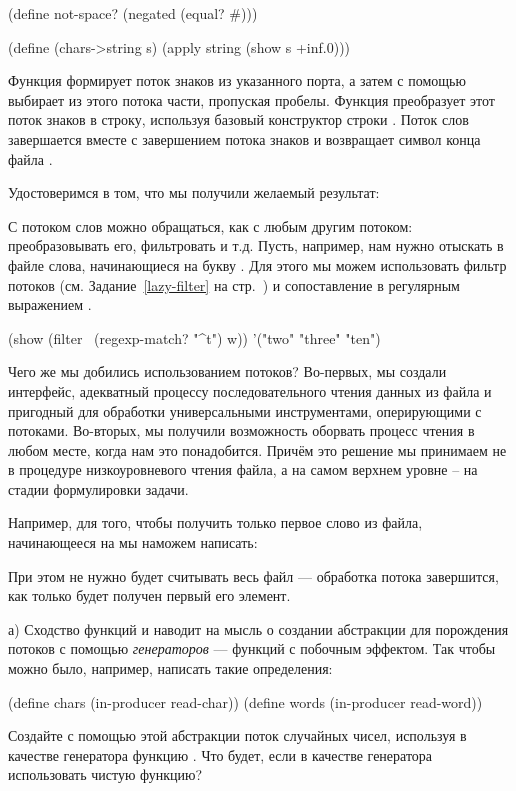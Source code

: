 {\begin{Definition}[emph={p,ch,s}]
(define not-space? (negated (equal? #\space)))

(define (chars->string s) 
  (apply string (show s +inf.0)))
\end{Definition}
\noindent
Функция  формирует поток знаков из указанного порта, а затем с помощью  выбирает из этого потока части, пропуская пробелы. Функция  преобразует этот поток знаков в строку, используя базовый конструктор строки . Поток слов завершается вместе с завершением потока знаков и возвращает символ конца файла .

Удостоверимся в том, что мы получили желаемый результат:

С потоком слов можно обращаться, как с любым другим потоком: преобразовывать его, фильтровать и т.д. Пусть, например, нам нужно отыскать в файле слова, начинающиеся на букву . Для этого мы можем использовать фильтр потоков  (см. Задание~\ref{lazy-filter} на стр.~\pageref{lazy-filter}) и сопоставление в регулярным выражением .

\REPL
 {(show (filter~ (regexp-match? "^t") w))}
 {'("two" "three" "ten")}

Чего же мы добились использованием потоков? Во-первых, мы создали интерфейс, адекватный процессу последовательного чтения данных из файла и пригодный для обработки универсальными инструментами, оперирующими с потоками.
Во-вторых, мы получили возможность оборвать процесс чтения в любом месте, когда нам это понадобится. Причём это решение мы принимаем не в процедуре низкоуровневого чтения файла, а на самом верхнем уровне – на стадии формулировки задачи. 

Например, для того, чтобы получить только первое слово из файла, начинающееся на  мы наможем написать:

\noindent
При этом не нужно будет считывать весь файл --- обработка потока завершится, как только будет получен первый его элемент.

\begin{Assignment}
а) Сходство функций  и  наводит на мысль о создании абстракции для порождения потоков с помощью \emph{генераторов} --- функций с побочным эффектом. Так чтобы можно было, например, написать такие определения:
\begin{SchemeCode}
(define chars (in-producer read-char))
(define words (in-producer read-word))
\end{SchemeCode}
Создайте с помощью этой абстракции поток случайных чисел, используя в качестве генератора функцию . Что будет, если в качестве генератора использовать чистую функцию?
\end{Assignment}


}
